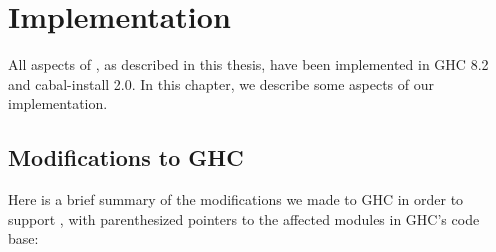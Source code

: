 \chapter{Implementation}

All aspects of \Backpack{}, as described in this thesis,
have been implemented in GHC 8.2 and cabal-install 2.0.  In this
chapter, we describe some aspects of our implementation.

\section{Modifications to GHC}

Here is a brief summary of the modifications we made to
GHC in order to support \Backpack{}, with parenthesized pointers to the
affected modules in GHC's code base:

